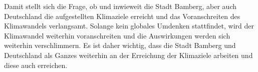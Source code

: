 Damit stellt sich die Frage, ob und inwieweit die Stadt Bamberg, aber auch Deutschland die aufgestellten Klimaziele erreicht und das Voranschreiten des Klimawandels verlangsamt. Solange kein globales Umdenken stattfindet, wird der Klimawandel weiterhin voranschreiten und die Auswirkungen werden sich weiterhin verschlimmern. Es ist daher wichtig, dass die Stadt Bamberg und Deutschland als Ganzes weiterhin an der Erreichung der Klimaziele arbeiten und diese auch erreichen.